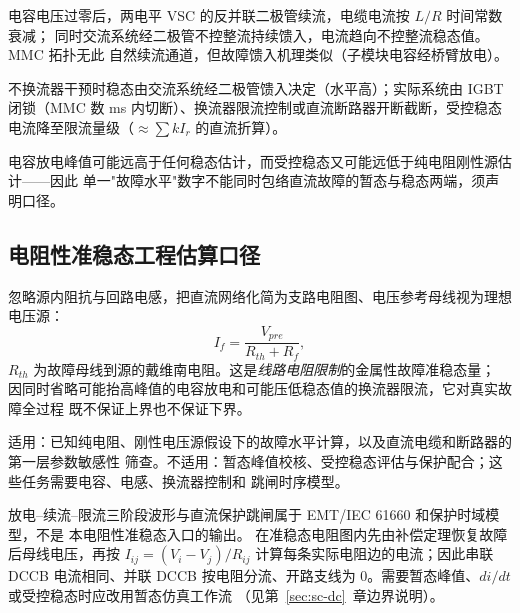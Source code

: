 \begin{definition}[阶段 2：续流与不控整流馈入]
电容电压过零后，两电平 VSC 的反并联二极管续流，电缆电流按 $L/R$ 时间常数衰减；
同时交流系统经二极管不控整流持续馈入，电流趋向不控整流稳态值。MMC 拓扑无此
自然续流通道，但故障馈入机理类似（子模块电容经桥臂放电）。
\end{definition}

\begin{definition}[阶段 3：稳态或阻断]
不换流器干预时稳态由交流系统经二极管馈入决定（水平高）；实际系统由
IGBT 闭锁（MMC 数 ms 内切断）、换流器限流控制或直流断路器开断截断，受控稳态
电流降至限流量级（$\approx\sum kI_r$ 的直流折算）。
\end{definition}

\begin{remark}[对故障水平估计的含义]
电容放电峰值可能远高于任何稳态估计，而受控稳态又可能远低于纯电阻刚性源估计——因此
单一"故障水平"数字不能同时包络直流故障的暂态与稳态两端，须声明口径。
\end{remark}

\subsection{电阻性准稳态工程估算口径}
\begin{definition}[电阻性刚性源准稳态模型]
忽略源内阻抗与回路电感，把直流网络化简为支路电阻图、电压参考母线视为理想电压源：
\begin{equation}
I_f=\frac{V_{pre}}{R_{th}+R_f},
\end{equation}
$R_{th}$ 为故障母线到源的戴维南电阻。这是\emph{线路电阻限制}的金属性故障准稳态量；
因同时省略可能抬高峰值的电容放电和可能压低稳态值的换流器限流，它对真实故障全过程
既不保证上界也不保证下界。
\end{definition}
适用：已知纯电阻、刚性电压源假设下的故障水平计算，以及直流电缆和断路器的第一层参数敏感性
筛查。不适用：暂态峰值校核、受控稳态评估与保护配合；这些任务需要电容、电感、换流器控制和
跳闸时序模型。

\begin{theorynote}
放电--续流--限流三阶段波形与直流保护跳闸属于 EMT/IEC 61660 和保护时域模型，不是
本电阻性准稳态入口的输出。
 在准稳态电阻图内先由补偿定理恢复故障后母线电压，再按
$I_{ij}=(V_i-V_j)/R_{ij}$ 计算每条实际电阻边的电流；因此串联 DCCB 电流相同、并联 DCCB
按电阻分流、开路支线为 0。需要暂态峰值、$di/dt$ 或受控稳态时应改用暂态仿真工作流
（见第~\ref{sec:sc-dc}~章边界说明）。
\end{theorynote}

